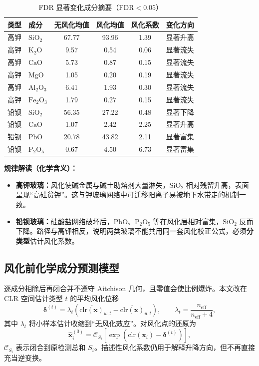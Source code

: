 \documentclass[fontset=windows, UTF8, 12pt, a4paper]{ctexart}
\begin{document}
\begin{table}[H]
\centering
\caption{FDR 显著变化成分摘要（$\mathrm{FDR}<0.05$）}
\label{tab:p1-sig}
\small
\begin{tabular}{llcccc}
\toprule
类型 & 成分 & 无风化均值 & 风化均值 & 风化系数 & 变化方向 \\
\midrule
高钾 & $\mathrm{SiO_2}$ & 67.77 & 93.96 & 1.39 & 显著升高 \\
高钾 & $\mathrm{K_2O}$ & 9.57 & 0.54 & 0.06 & 显著流失 \\
高钾 & $\mathrm{CaO}$ & 5.73 & 0.87 & 0.15 & 显著流失 \\
高钾 & $\mathrm{MgO}$ & 1.05 & 0.20 & 0.19 & 显著流失 \\
高钾 & $\mathrm{Al_2O_3}$ & 6.41 & 1.93 & 0.30 & 显著流失 \\
高钾 & $\mathrm{Fe_2O_3}$ & 1.79 & 0.27 & 0.15 & 显著流失 \\
铅钡 & $\mathrm{SiO_2}$ & 56.35 & 27.22 & 0.48 & 显著下降 \\
铅钡 & $\mathrm{CaO}$ & 1.07 & 2.42 & 2.25 & 显著升高 \\
铅钡 & $\mathrm{PbO}$ & 20.78 & 43.82 & 2.11 & 显著富集 \\
铅钡 & $\mathrm{P_2O_5}$ & 0.67 & 4.50 & 6.73 & 显著富集 \\
\bottomrule
\end{tabular}
\end{table}

\textbf{规律解读（化学含义）：}
\begin{itemize}[leftmargin=2em]
  \item \textbf{高钾玻璃：}风化使碱金属与碱土助熔剂大量淋失，$\mathrm{SiO_2}$ 相对残留升高，表面呈现“高硅贫钾”。这与钾玻璃网络中可迁移阳离子易被地下水带走的机制一致。
  \item \textbf{铅钡玻璃：}硅酸盐网络破坏后，$\mathrm{PbO}$、$\mathrm{P_2O_5}$ 等在风化层相对富集，$\mathrm{SiO_2}$ 反而下降。路径与高钾相反，说明两类玻璃不能共用同一套风化校正公式，必须\textbf{分类型}估计风化系数。
\end{itemize}

\subsection{风化前化学成分预测模型}

逐成分相除后再闭合并不遵守 Aitchison 几何，且零值会使比例爆炸。本文改在 CLR 空间估计类型 $t$ 的平均风化位移
\[
\bm{\delta}^{(t)}
=\lambda_t\!\left(\overline{\mathrm{clr}(\bm{x})}_{w,t}
-\overline{\mathrm{clr}(\bm{x})}_{u,t}\right),\qquad
\lambda_t=\frac{n_{\mathrm{eff}}}{n_{\mathrm{eff}}+4},
\]
其中 $\lambda_t$ 将小样本估计收缩到“无风化效应”。对风化点的还原为
\[
\hat{\bm{x}}_i^{(0)}
=\mathcal{C}_{S_i}\!\left[
\exp\!\left(\mathrm{clr}(\bm{x}_i)-\bm{\delta}^{(t)}\right)\right],
\]
$\mathcal{C}_{S_i}$ 表示闭合到原检测总和 $S_i$。描述性风化系数仍用于解释升降方向，但不再直接充当逆变换。
\end{document}

